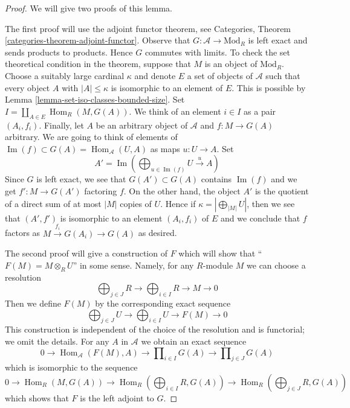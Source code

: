 \documentclass[10pt,a4paper]{amsart}
\theoremstyle{plain}
\theoremstyle{definition}
\theoremstyle{remark}
\numberwithin{equation}{subsection}
\def\Hom{\mathop{\mathrm{Hom}}\nolimits}
\def\Im{\mathop{\mathrm{Im}}}
\begin{document}
\begin{proof}
We will give two proofs of this lemma.

\medskip\noindent
The first proof will use the adjoint functor theorem, see
Categories, Theorem \ref{categories-theorem-adjoint-functor}.
Observe that $G : \mathcal{A} \to \text{Mod}_R$ is left exact and sends
products to products. Hence $G$ commutes with limits. To check the set
theoretical condition in the theorem, suppose that $M$ is an object of
$\text{Mod}_R$. Choose a suitably large cardinal $\kappa$ and denote $E$
a set of objects of $\mathcal{A}$ such that every object $A$ with
$|A| \leq \kappa$ is isomorphic to an element of $E$. This is possible
by Lemma \ref{lemma-set-iso-classes-bounded-size}. Set
$I = \coprod_{A \in E} \Hom_R(M, G(A))$.
We think of an element $i \in I$ as a pair $(A_i, f_i)$.
Finally, let $A$ be an arbitrary object of $\mathcal{A}$
and $f : M \to G(A)$ arbitrary. We are going to think of
elements of $\Im(f) \subset G(A) = \Hom_\mathcal{A}(U, A)$
as maps $u : U \to A$. Set
$$
A' = \Im(\bigoplus\nolimits_{u \in \Im(f)} U \xrightarrow{u} A)
$$
Since $G$ is left exact, we see that $G(A') \subset G(A)$
contains $\Im(f)$ and we get $f' : M \to G(A')$ factoring $f$.
On the other hand, the object $A'$ is
the quotient of a direct sum of at most $|M|$ copies of $U$.
Hence if $\kappa = |\bigoplus_{|M|} U|$, then we see that $(A', f')$
is isomorphic to an element $(A_i, f_i)$ of $E$ and we conclude that $f$
factors as $M \xrightarrow{f_i} G(A_i) \to G(A)$ as desired.

\medskip\noindent
The second proof will give a construction of $F$ which will show
that ``$F(M) = M \otimes_R U$'' in some sense. Namely, for any
$R$-module $M$ we can choose a resolution
$$
\bigoplus\nolimits_{j \in J} R \to
\bigoplus\nolimits_{i \in I} R \to
M \to 0
$$
Then we define $F(M)$ by the corresponding exact sequence
$$
\bigoplus\nolimits_{j \in J} U \to
\bigoplus\nolimits_{i \in I} U \to
F(M) \to 0
$$
This construction is independent of the choice of the resolution
and is functorial; we omit the details.
For any $A$ in $\mathcal{A}$ we obtain an exact sequence
$$
0 \to \Hom_\mathcal{A}(F(M), A) \to
\prod\nolimits_{i \in I} G(A) \to
\prod\nolimits_{j \in J} G(A)
$$
which is isomorphic to the sequence
$$
0 \to \Hom_R(M, G(A)) \to
\Hom_R(\bigoplus\nolimits_{i \in I} R, G(A)) \to
\Hom_R(\bigoplus\nolimits_{j \in J} R, G(A))
$$
which shows that $F$ is the left adjoint to $G$.
\end{proof}
\end{document}
